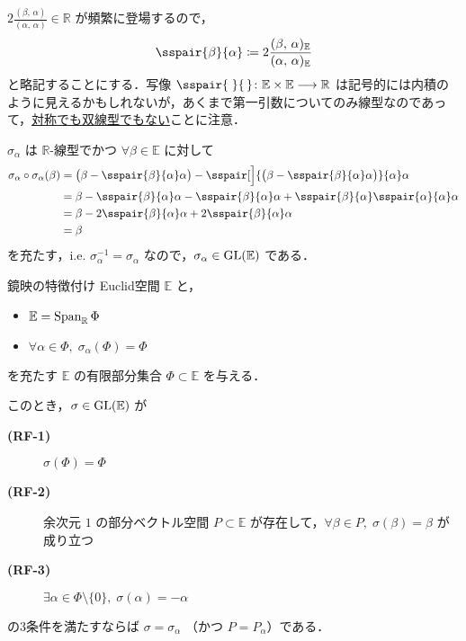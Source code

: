 \documentclass[rep_main]{subfiles}
\begin{document}
\begin{marker}
    $2 \frac{(\beta,\, \alpha)}{(\alpha,\, \alpha)} \in \mathbb{R}$ が頻繁に登場するので，
    \begin{align}
		\sspair{\beta}{\alpha} \coloneqq 2\frac{(\beta,\, \alpha)_{\mathbb{E}}}{(\alpha,\, \alpha)_{\mathbb{E}}}
	\end{align}
	と略記することにする．写像 $\sspair{\;}{\,} \colon \mathbb{E} \times \mathbb{E} \lto \mathbb{R}$ は記号的には内積のように見えるかもしれないが，あくまで第一引数についてのみ線型なのであって，\underline{対称でも双線型でもない}ことに注意．
\end{marker}

$\sigma_\alpha$ は $\mathbb{R}$-線型でかつ $\forall \beta \in \mathbb{E}$ に対して
\begin{align}
	\sigma_\alpha \circ \sigma_\alpha (\beta) 
	&= \bigl(\beta - \sspair{\beta}{\alpha} \alpha\bigr) - \sspair[\Big]{\bigl(\beta - \sspair{\beta}{\alpha} \alpha\bigr)}{\alpha}\alpha \\
	&= \beta - \sspair{\beta}{\alpha} \alpha - \sspair{\beta}{\alpha}\alpha + \sspair{\beta}{\alpha}\sspair{\alpha}{\alpha} \alpha \\
	&= \beta - 2\sspair{\beta}{\alpha}\alpha + 2\sspair{\beta}{\alpha}\alpha \\
	&= \beta
\end{align}
を充たす，i.e. $\sigma_\alpha^{-1} = \sigma_\alpha$ なので，$\sigma_\alpha \in \mathrm{GL}(\mathbb{E})$ である．

\begin{mylem}[label=lem:refrect]{鏡映の特徴付け}
	Euclid空間 $\mathbb{E}$ と，
	\begin{itemize}
		\item $\mathbb{E} = \operatorname{Span}_{\mathbb{R}}\Phi$ 
		\item $\forall \alpha \in \Phi,\; \sigma_\alpha(\Phi) = \Phi$ 
	\end{itemize}
	を充たす $\mathbb{E}$ の有限部分集合 $\Phi \subset \mathbb{E}$ を与える．

	このとき，$\sigma \in \mathrm{GL}(\mathbb{E})$ が
	\begin{description}
		\item[\textbf{(RF-1)}]  $\sigma(\Phi) = \Phi$
		\item[\textbf{(RF-2)}]  余次元 $1$ の部分ベクトル空間 $P \subset \mathbb{E}$ が存在して，$\forall \beta \in P,\; \sigma(\beta) = \beta$ が成り立つ
		\item[\textbf{(RF-3)}]  $\exists \alpha \in \Phi \setminus \{0\},\; \sigma(\alpha) = -\alpha$
	\end{description}
	の3条件を満たすならば $\sigma = \sigma_\alpha$ （かつ $P = P_\alpha$）である．
\end{mylem}
\end{document}
